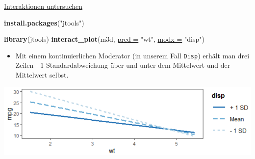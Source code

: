 \documentclass[
  ignorenonframetext,
]{beamer}
\newenvironment{Shaded}{\begin{snugshade}}{\end{snugshade}}
\newcommand{\DataTypeTok}[1]{\textcolor[rgb]{0.74,0.68,0.62}{\underline{#1}}}
\newcommand{\KeywordTok}[1]{\textcolor[rgb]{0.26,0.66,0.93}{\textbf{#1}}}
\newcommand{\NormalTok}[1]{\textcolor[rgb]{0.74,0.68,0.62}{#1}}
\newcommand{\StringTok}[1]{\textcolor[rgb]{0.02,0.61,0.04}{#1}}
\providecommand{\tightlist}{%
  \setlength{\itemsep}{0pt}\setlength{\parskip}{0pt}}
\begin{document}
\begin{frame}[fragile]{\href{https://cran.r-project.org/web/packages/jtools/vignettes/interactions.html}{Interaktionen
untersuchen}}
\protect\hypertarget{interaktionen-untersuchen}{}

\begin{Shaded}
\begin{Highlighting}[]
\KeywordTok{install.packages}\NormalTok{(}\StringTok{"jtools"}\NormalTok{)}
\end{Highlighting}
\end{Shaded}

\begin{Shaded}
\begin{Highlighting}[]
\KeywordTok{library}\NormalTok{(jtools)}
\KeywordTok{interact_plot}\NormalTok{(m3d, }\DataTypeTok{pred =} \StringTok{"wt"}\NormalTok{, }\DataTypeTok{modx =} \StringTok{"disp"}\NormalTok{)}
\end{Highlighting}
\end{Shaded}

\begin{itemize}
\tightlist
\item
  Mit einem kontinuierlichen Moderator (in unserem Fall \texttt{Disp})
  erhält man drei Zeilen - 1 Standardabweichung über und unter dem
  Mittelwert und der Mittelwert selbst.
\end{itemize}

\includegraphics{figure/mtcars_model_interact.PNG}

\end{frame}
\end{document}
